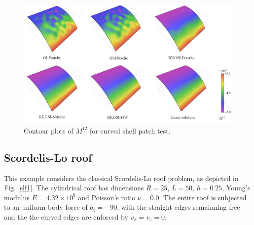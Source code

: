 \begin{figure}[!ht]
\centering
\includegraphics[width=\textwidth]{figures/ptc}
\caption{Contour plots of $M^{12}$ for curved shell patch test.}\label{ptf2}
\end{figure}

\subsection{Scordelis-Lo roof}
This example considers the classical Scordelis-Lo roof problem, as depicted in Fig. \ref{slf1}. The cylindrical roof has dimensions $R=25$, $L=50$, $h=0.25$, Young's modulus $E=4.32\times 10^8$ and Poisson's ratio $\nu=0.0$. The entire roof is subjected to an uniform body force of $b_z = -90$, with the straight edges remainning free and the the curved edges are enforced by $v_x=v_z=0$.

